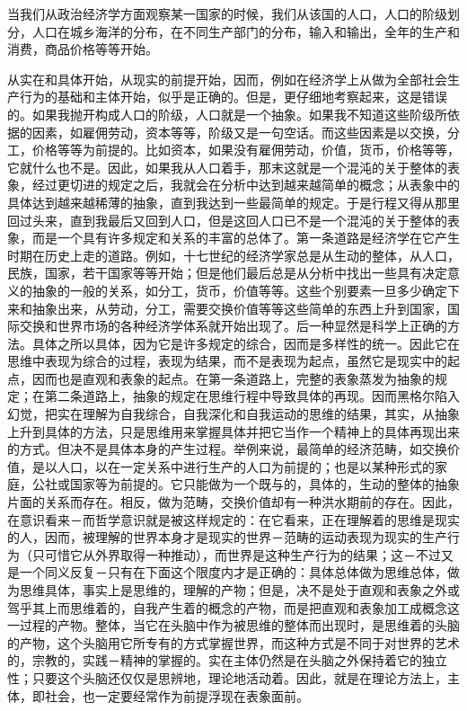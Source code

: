 \documentclass[a4paper,twoside,12pt,AutoFakeBold]{ctexart}
\begin{document}
当我们从政治经济学方面观察某一国家的时候，我们从该国的人口，人口的阶级划分，人口在城乡海洋的分布，在不同生产部门的分布，输入和输出，全年的生产和消费，商品价格等等开始。

从实在和具体开始，从现实的前提开始，因而，例如在经济学上从做为全部社会生产行为的基础和主体开始，似乎是正确的。但是，更仔细地考察起来，这是错误的。如果我抛开构成人口的阶级，人口就是一个抽象。如果我不知道这些阶级所依据的因素，如雇佣劳动，资本等等，阶级又是一句空话。而这些因素是以交换，分工，价格等等为前提的。比如资本，如果没有雇佣劳动，价值，货币，价格等等，它就什么也不是。因此，如果我从人口着手，那末这就是一个混沌的关于整体的表象，经过更切进的规定之后，我就会在分析中达到越来越简单的概念；从表象中的具体达到越来越稀薄的抽象，直到我达到一些最简单的规定。于是行程又得从那里回过头来，直到我最后又回到人口，但是这回人口已不是一个混沌的关于整体的表象，而是一个具有许多规定和关系的丰富的总体了。第一条道路是经济学在它产生时期在历史上走的道路。例如，十七世纪的经济学家总是从生动的整体，从人口，民族，国家，若干国家等等开始；但是他们最后总是从分析中找出一些具有决定意义的抽象的一般的关系，如分工，货币，价值等等。这些个别要素一旦多少确定下来和抽象出来，从劳动，分工，需要交换价值等等这些简单的东西上升到国家，国际交换和世界市场的各种经济学体系就开始出现了。后一种显然是科学上正确的方法。具体之所以具体，因为它是许多规定的综合，因而是多样性的统一。因此它在思维中表现为综合的过程，表现为结果，而不是表现为起点，虽然它是现实中的起点，因而也是直观和表象的起点。在第一条道路上，完整的表象蒸发为抽象的规定；在第二条道路上，抽象的规定在思维行程中导致具体的再现。因而黑格尔陷入幻觉，把实在理解为自我综合，自我深化和自我运动的思维的结果，其实，从抽象上升到具体的方法，只是思维用来掌握具体并把它当作一个精神上的具体再现出来的方式。但决不是具体本身的产生过程。举例来说，最简单的经济范畴，如交换价值，是以人口，以在一定关系中进行生产的人口为前提的；也是以某种形式的家庭，公社或国家等为前提的。它只能做为一个既与的，具体的，生动的整体的抽象片面的关系而存在。相反，做为范畴，交换价值却有一种洪水期前的存在。因此，在意识看来－而哲学意识就是被这样规定的：在它看来，正在理解着的思维是现实的人，因而，被理解的世界本身才是现实的世界－范畴的运动表现为现实的生产行为（只可惜它从外界取得一种推动），而世界是这种生产行为的结果；这－不过又是一个同义反复－只有在下面这个限度内才是正确的：具体总体做为思维总体，做为思维具体，事实上是思维的，理解的产物；但是，决不是处于直观和表象之外或驾乎其上而思维着的，自我产生着的概念的产物，而是把直观和表象加工成概念这一过程的产物。整体，当它在头脑中作为被思维的整体而出现时，是思维着的头脑的产物，这个头脑用它所专有的方式掌握世界，而这种方式是不同于对世界的艺术的，宗教的，实践－精神的掌握的。实在主体仍然是在头脑之外保持着它的独立性；只要这个头脑还仅仅是思辨地，理论地活动着。因此，就是在理论方法上，主体，即社会，也一定要经常作为前提浮现在表象面前。
\end{document}
